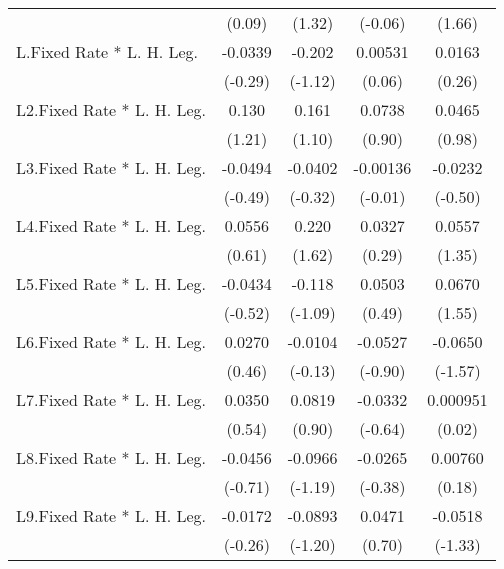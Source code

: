 {\begin{longtable}{l*{4}{c}}
                &   (0.09)         &   (1.32)         &  (-0.06)         &   (1.66)         \\
[1em]
L.Fixed Rate * L. H. Leg.&  -0.0339         &   -0.202         &  0.00531         &   0.0163         \\
                &  (-0.29)         &  (-1.12)         &   (0.06)         &   (0.26)         \\
[1em]
L2.Fixed Rate * L. H. Leg.&    0.130         &    0.161         &   0.0738         &   0.0465         \\
                &   (1.21)         &   (1.10)         &   (0.90)         &   (0.98)         \\
[1em]
L3.Fixed Rate * L. H. Leg.&  -0.0494         &  -0.0402         & -0.00136         &  -0.0232         \\
                &  (-0.49)         &  (-0.32)         &  (-0.01)         &  (-0.50)         \\
[1em]
L4.Fixed Rate * L. H. Leg.&   0.0556         &    0.220         &   0.0327         &   0.0557         \\
                &   (0.61)         &   (1.62)         &   (0.29)         &   (1.35)         \\
[1em]
L5.Fixed Rate * L. H. Leg.&  -0.0434         &   -0.118         &   0.0503         &   0.0670         \\
                &  (-0.52)         &  (-1.09)         &   (0.49)         &   (1.55)         \\
[1em]
L6.Fixed Rate * L. H. Leg.&   0.0270         &  -0.0104         &  -0.0527         &  -0.0650         \\
                &   (0.46)         &  (-0.13)         &  (-0.90)         &  (-1.57)         \\
[1em]
L7.Fixed Rate * L. H. Leg.&   0.0350         &   0.0819         &  -0.0332         & 0.000951         \\
                &   (0.54)         &   (0.90)         &  (-0.64)         &   (0.02)         \\
[1em]
L8.Fixed Rate * L. H. Leg.&  -0.0456         &  -0.0966         &  -0.0265         &  0.00760         \\
                &  (-0.71)         &  (-1.19)         &  (-0.38)         &   (0.18)         \\
[1em]
L9.Fixed Rate * L. H. Leg.&  -0.0172         &  -0.0893         &   0.0471         &  -0.0518         \\
                &  (-0.26)         &  (-1.20)         &   (0.70)         &  (-1.33)         \\

\end{longtable}}

